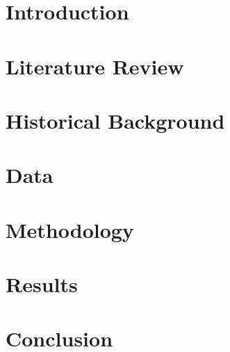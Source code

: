 
\section*{Introduction}



\newpage
\section{Literature Review} \label{sec:lit_rev}


\newpage
\section{Historical Background} \label{sec:hist_back}



\newpage
\section{Data} \label{sec:data}


\newpage
\section{Methodology} \label{sec:methodology}


\newpage
\section{Results} \label{sec:results}


\newpage

\section*{Conclusion} 



